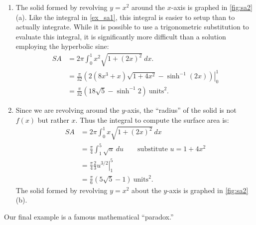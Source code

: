 {\begin{enumerate}
	\item		The solid formed by revolving $y=x^2$ around the $x$-axis is graphed in \autoref{fig:sa2}(a). Like the integral in \autoref{ex_sa1}, this integral is easier to setup than to actually integrate. While it is possible to use a trigonometric substitution to evaluate this integral, it is significantly more difficult than a solution employing the hyperbolic sine:
\begin{align*}
	SA &= 2\pi\int_0^1 x^2\sqrt{1+(2x)^2}\ dx. \\
	&= \left.\frac{\pi}{32}\left(2(8x^3+x)\sqrt{1+4x^2}-\sinh^{-1}(2x)\right)\right|_0^1\\
	&=\frac{\pi}{32}\left(18\sqrt{5}-\sinh^{-1}2\right)\ \text{units}^2.
\end{align*}

	\item	 Since we are revolving around the $y$-axis, the ``radius'' of the solid is not $f(x)$ but rather $x$. Thus the integral to compute the surface area is:
\begin{align*}
	SA &= 2\pi\int_0^1x\sqrt{1+(2x)^2}\ dx \\
	&=	\frac{\pi}4\int_1^5 \sqrt{u}\ du \qquad\text{substitute $u=1+4x^2$} \\
	&= \left.\frac{\pi}{4}\frac23 u^{3/2}\right|_1^5\\
	&= \frac{\pi}6\left(5\sqrt{5}-1\right)\ \text{units}^2.
\end{align*}
 The solid formed by revolving $y=x^2$ about the $y$-axis is graphed in \autoref{fig:sa2} (b).\eoehere
\end{enumerate}}

Our final example is a famous mathematical ``paradox.''

